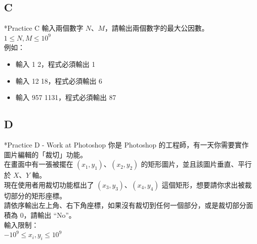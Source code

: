 \documentclass[t]{beamer}
\begin{document}
\subsection{C}
\begin{frame}{*Practice C}
  輸入兩個數字 $N$、$M$，請輸出兩個數字的最大公因數。\\
  \vspace{1em}
  $1\le N, M\le 10^{9}$\\
  \vspace{1em}
  例如：
  \begin{itemize}
    \item 輸入 1 2，程式必須輸出 1
    \item 輸入 12 18，程式必須輸出 6
    \item 輸入 957 1131，程式必須輸出 87
  \end{itemize}
\end{frame}

\subsection{D}
\begin{frame}{*Practice D - Work at Photoshop}
  你是 Photoshop 的工程師，有一天你需要實作圖片編輯的「裁切」功能。\\
  在畫面中有一張被擺在 $(x_{1},y_{1})$、$(x_{2},y_{2})$ 的矩形圖片，並且該圖片垂直、平行於 $X$、$Y$ 軸。\\
  現在使用者用裁切功能框出了 $(x_{3},y_{3})$、$(x_{4},y_{4})$ 這個矩形，想要請你求出被裁切部分的矩形座標。\\
  請依序輸出左上角、右下角座標，如果沒有裁切到任何一個部分，或是裁切部分面積為 $0$，請輸出 ``No''。\\
  \vspace{1em}
  輸入限制：\\
  $-10^{9}\le x_{i}, y_{i} \le 10^{9}$
\end{frame}
\end{document}
